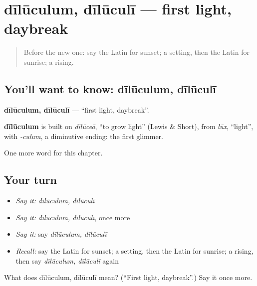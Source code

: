 \section[dīlūculum, dīlūculī]{dīlūculum, dīlūculī — first light, daybreak}

\label{lesson:LA-C207-diluculum}



\begin{quote}
Before the new one: say the Latin for sunset; a setting, then the Latin for sunrise; a rising.
\end{quote}

\subsection*{You'll want to know: dīlūculum, dīlūculī}
\textbf{dīlūculum, dīlūculī} — \textquotedblleft{}first light, daybreak\textquotedblright{}.

\begin{cousinweb}
\textbf{dīlūculum} is built on \emph{dīlūceō}, \textquotedblleft{}to grow light\textquotedblright{} (Lewis \& Short), from \emph{lūx}, \textquotedblleft{}light\textquotedblright{}, with \emph{-culum}, a diminutive ending: the first glimmer.
\end{cousinweb}

\begin{grammarlens}[title={What you've built}]
One more word for this chapter.
\end{grammarlens}

\subsection*{Your turn}
\begin{itemize}
\raggedright
  \item \emph{Say it:} \emph{dīlūculum, dīlūculī}
  \item \emph{Say it:} \emph{dīlūculum, dīlūculī}, once more
  \item \emph{Say it:} say \emph{dīlūculum, dīlūculī}
  \item \emph{Recall:} say the Latin for sunset; a setting, then the Latin for sunrise; a rising, then say \emph{dīlūculum, dīlūculī} again
\end{itemize}

\begin{tcolorbox}[breakable,colback=teal!4,colframe=teal!35!black,title={Before you move on}]
What does dīlūculum, dīlūculī mean? (\textquotedblleft{}First light, daybreak\textquotedblright{}.) Say it once more.
\end{tcolorbox}
